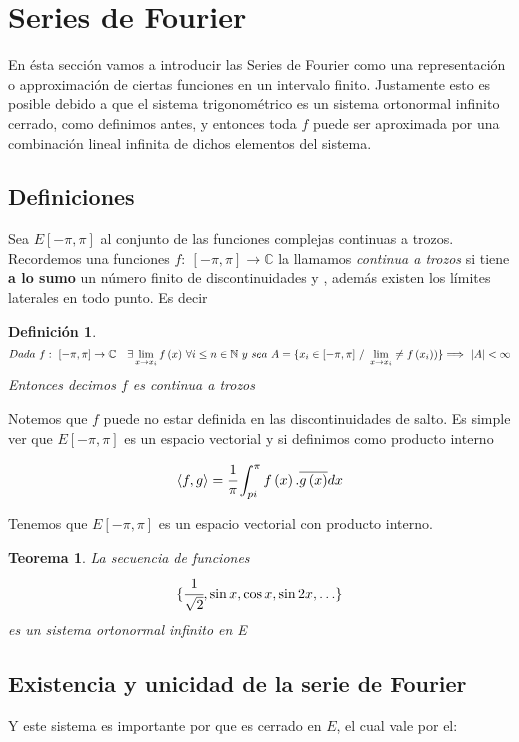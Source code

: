\documentclass[a4paper,spanish]{article}
\def\N {\mathbb{N}}
\def\C {\mathbb{C}}
\newtheorem{teo}[prop]{Teorema}
\newtheorem{defi}[prop]{Definici\'on}
\numberwithin{equation}{section}
\begin{document}
\section{Series de Fourier}

En \'esta secci\'on vamos a introducir las Series de Fourier como una representaci\'on o approximaci\'on de ciertas funciones en un intervalo finito. Justamente esto es posible debido a que el sistema trigonom\'etrico es un sistema ortonormal infinito cerrado, como definimos antes, y entonces toda $f$ puede ser aproximada por una combinaci\'on lineal infinita de dichos elementos del sistema.

\subsection{Definiciones}

Sea $E[-\pi,\pi]$ al conjunto de las funciones complejas continuas a trozos. Recordemos una funciones $f: \ [-\pi,\pi] \rightarrow \C$ la llamamos \textit{continua a trozos} si tiene \textbf{a lo sumo} un n\'umero finito de discontinuidades y , adem\'as existen los l\'imites laterales en todo punto. Es decir

\begin{defi}
\[ Dada \ f: \ [-\pi,\pi] \rightarrow \C \quad \exists \lim \limits _{x \rightarrow x_i} {f\left({x}\right)} \ \forall i\leq n \in \N \ y \ sea \ A=\lbrace{x_i \in [-\pi,\pi] \ / \ \lim \limits _{x \rightarrow x_i} \neq f\left({x_i)}\right)}\rbrace \\
\Longrightarrow \ \vert{A}\vert < \infty \]
Entonces decimos $f$ es continua a trozos
\end{defi}

Notemos que $f$ puede no estar definida en las discontinuidades de salto. Es simple ver que $E[-\pi,\pi]$ es un espacio vectorial y si definimos como producto interno

\[ \langle{f,g}\rangle = \cfrac{1}{\pi} \int_{\-pi}^{\pi}{f\left({x}\right).\overline{g\left({x}\right)}} dx\]

Tenemos que $E[-\pi,\pi]$ es un espacio vectorial con producto interno.

\begin{teo}
La secuencia de funciones
\[\lbrace{\cfrac{1}{\sqrt{2}}, \sin{x}, \cos{x}, \sin{2x},\dots}\rbrace\]
es un sistema ortonormal infinito en E
\end{teo}

\subsection{Existencia y unicidad de la serie de Fourier}
Y este sistema es importante por que es cerrado en $E$, el cual vale por el:
\end{document}
